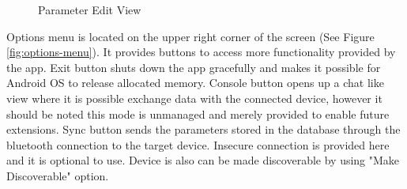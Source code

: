 \begin{figure}
	\centering
	\caption{Parameter Edit View}
	\label{fig:bluetooth-menu}
\end{figure}

Options menu is located on the upper right corner of the screen (See Figure \ref{fig:options-menu}). It provides buttons to access more functionality provided by the app. Exit button shuts down the app gracefully and makes it possible for Android OS to release allocated memory. Console button opens up a chat like view where it is possible exchange data with the connected device, however it should be noted this mode is unmanaged and merely provided to enable future extensions. Sync button sends the parameters stored in the database through the bluetooth connection to the target device. Insecure connection is provided here and it is optional to use. Device is also can be made discoverable by using "Make Discoverable" option.

